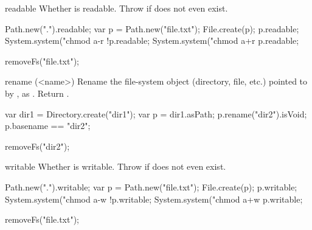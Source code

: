 \begin{urbiscriptapi}
\item[readable]
  Whether \this is readable.  Throw if does not even exist.
\begin{urbiassert}
Path.new(".").readable;
var p = Path.new("file.txt");
File.create(p);
p.readable;
System.system("chmod a-r %
!p.readable;
System.system("chmod a+r %
p.readable;
\end{urbiassert}
\begin{urbicomment}
removeFs("file.txt");
\end{urbicomment}


\item[rename](<name>)%
  Rename the file-system object (directory, file, etc.) pointed to by \this,
  as .  Return .
\begin{urbiassert}
var dir1 = Directory.create("dir1");
var p = dir1.asPath;
p.rename("dir2").isVoid;
p.basename == "dir2";
\end{urbiassert}
\begin{urbicomment}
removeFs("dir2");
\end{urbicomment}


\item[writable]
  Whether \this is writable.  Throw if does not even exist.
\begin{urbiassert}
Path.new(".").writable;
var p = Path.new("file.txt");
File.create(p);
p.writable;
System.system("chmod a-w %
!p.writable;
System.system("chmod a+w %
p.writable;
\end{urbiassert}
\begin{urbicomment}
removeFs("file.txt");
\end{urbicomment}
\end{urbiscriptapi}


